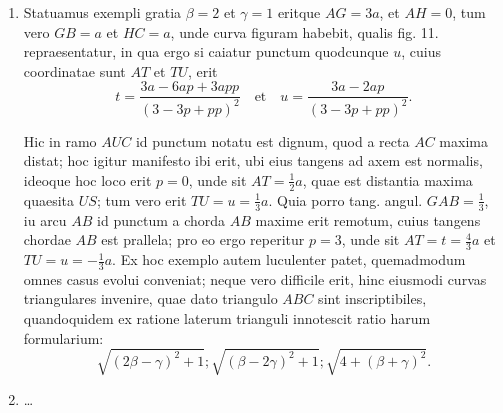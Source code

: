 \documentclass[10pt,a4paper]{article}
\newcommand{\switchenum}{\setcounter{enumi}{\arabic{enumi}-1}\switchcolumn}
\begin{document}
\begin{paracol}{2}
\begin{enumerate}[topsep=1px]
		\item Statuamus exempli gratia $\beta = 2$ et $\gamma = 1$ eritque $AG = 3a$, et $AH = 0$, tum vero $GB = a$ et $HC=a$, unde curva figuram habebit, qualis fig. 11. repraesentatur, in qua ergo si caiatur punctum quodcunque $u$, cuius coordinatae sunt $AT$ et $TU$, erit
		\[
			t = \frac{3a-6ap+3app}{(3-3p+pp)^2} \quad \text{et} \quad u = \frac{3a-2ap}{(3-3p+pp)^2}.
		\]
		\par Hic in ramo $AUC$ id punctum notatu est dignum, quod a recta $AC$ maxima distat; hoc igitur manifesto ibi erit, ubi eius tangens ad axem est normalis, ideoque hoc loco erit $p=0$, unde sit $AT=\frac{1}{2}a$, quae est distantia maxima quaesita $US$; tum vero erit $TU=u=\frac{1}{3}a$. Quia porro tang. angul. $GAB=\frac{1}{3}$, iu arcu $AB$ id punctum a chorda $AB$ maxime erit remotum, cuius tangens chordae $AB$ est prallela; pro eo ergo reperitur $p=3$, unde sit $AT= t = \frac{4}{3}a$ et $TU=u=-\frac{1}{3}a$. Ex hoc exemplo autem luculenter patet, quemadmodum omnes casus evolui conveniat; neque vero difficile erit, hinc eiusmodi curvas triangulares invenire, quae dato triangulo $ABC$ sint inscriptibiles, quandoquidem ex ratione laterum trianguli innotescit ratio harum formularium:
		\[
			\sqrt{(2\beta-\gamma)^2+1}; \sqrt{(\beta-2\gamma)^2+1}; \sqrt{4+(\beta+\gamma)^2}.
		\]
				
		\switchenum
		\item \ldots
		\switchcolumn*
		

\end{enumerate}
\end{paracol}
\end{document}

